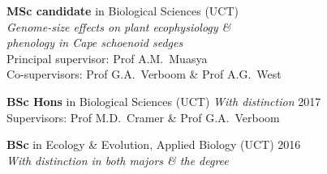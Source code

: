 \begin{hangparas}{2em}{1}

\textbf{MSc candidate} in Biological Sciences
  {\small (UCT)                                                               \\
  \hspace{2em} \textit{Genome-size effects on plant ecophysiology \&          \\
  \hspace{4em} phenology in Cape schoenoid sedges}                            \\
  \hspace{2em} Principal supervisor: Prof A.M.~Muasya                         \\
  \hspace{2em} Co-supervisors: Prof G.A.~Verboom \& Prof A.G.~West}

\textbf{BSc Hons} in Biological Sciences {\small (UCT) \textit{With distinction} \hfill 2017 \\
  \hspace{2em} Supervisors: Prof M.D.~Cramer \& Prof G.A.~Verboom}

\textbf{BSc} in Ecology \& Evolution, Applied Biology {\small (UCT) \hfill 2016 \\
  \hspace{2em} \textit{With distinction in both majors \& the degree}}

\end{hangparas}
